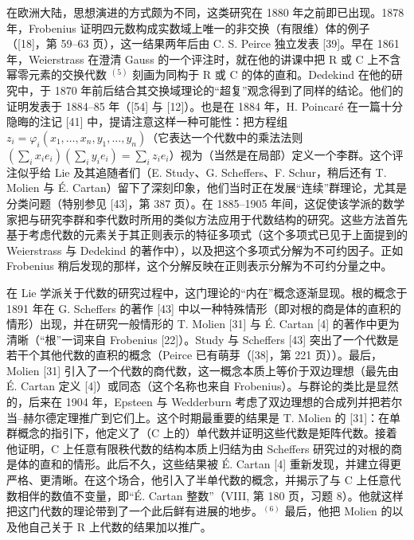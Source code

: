 在欧洲大陆，思想演进的方式颇为不同，这类研究在 1880 年之前即已出现。1878 年，Frobenius 证明四元数构成实数域上唯一的非交换（有限维）体的例子（{[}18{]}，第 59--63 页），这一结果两年后由 C. S. Peirce 独立发表 {[}39{]}。早在 1861 年，Weierstrass 在澄清 Gauss 的一个评注时，就在他的讲课中把 R 或 C 上不含幂零元素的交换代数 \(^{(5)}\) 刻画为同构于 R 或 C 的体的直和。Dedekind 在他的研究中，于 1870 年前后结合其交换域理论的“超复”观念得到了同样的结论。他们的证明发表于 1884--85 年（{[}54{]} 与 {[}12{]}）。也是在 1884 年，H. Poincaré 在一篇十分隐晦的注记 {[}41{]} 中，提请注意这样一种可能性：把方程组 \(z_{i} = \varphi_{i}(x_{1}, \ldots, x_{n}, y_{1}, \ldots, y_{n})\)（它表达一个代数中的乘法法则 \((\sum_{i} x_{i} e_{i})(\sum_{i} y_{i} e_{i}) = \sum_{i} z_{i} e_{i}\)）视为（当然是在局部）定义一个李群。这个评注似乎给 Lie 及其追随者们（E. Study、G. Scheffers、F. Schur，稍后还有 T. Molien 与 É. Cartan）留下了深刻印象，他们当时正在发展“连续”群理论，尤其是分类问题（特别参见 {[}43{]}，第 387 页）。在 1885--1905 年间，这促使该学派的数学家把与研究李群和李代数时所用的类似方法应用于代数结构的研究。这些方法首先基于考虑代数的元素关于其正则表示的特征多项式（这个多项式已见于上面提到的 Weierstrass 与 Dedekind 的著作中），以及把这个多项式分解为不可约因子。正如 Frobenius 稍后发现的那样，这个分解反映在正则表示分解为不可约分量之中。

在 Lie 学派关于代数的研究过程中，这门理论的“内在”概念逐渐显现。根的概念于 1891 年在 G. Scheffers 的著作 {[}43{]} 中以一种特殊情形（即对根的商是体的直积的情形）出现，并在研究一般情形的 T. Molien {[}31{]} 与 É. Cartan {[}4{]} 的著作中更为清晰（“根”一词来自 Frobenius {[}22{]}）。Study 与 Scheffers {[}43{]} 突出了一个代数是若干个其他代数的直积的概念（Peirce 已有萌芽（{[}38{]}，第 221 页））。最后，Molien {[}31{]} 引入了一个代数的商代数，这一概念本质上等价于双边理想（最先由 É. Cartan 定义 {[}4{]}）或同态（这个名称也来自 Frobenius）。与群论的类比是显然的，后来在 1904 年，Epsteen 与 Wedderburn 考虑了双边理想的合成列并把若尔当--赫尔德定理推广到它们上。这个时期最重要的结果是 T. Molien 的 {[}31{]}：在单群概念的指引下，他定义了（C 上的）单代数并证明这些代数是矩阵代数。接着他证明，C 上任意有限秩代数的结构本质上归结为由 Scheffers 研究过的对根的商是体的直和的情形。此后不久，这些结果被 É. Cartan {[}4{]} 重新发现，并建立得更严格、更清晰。在这个场合，他引入了半单代数的概念，并揭示了与 C 上任意代数相伴的数值不变量，即“É. Cartan 整数”（VIII, 第 180 页，习题 8）。他就这样把这门代数的理论带到了一个此后鲜有进展的地步。\(^{(6)}\) 最后，他把 Molien 的以及他自己关于 R 上代数的结果加以推广。

